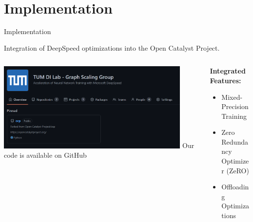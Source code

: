 \section{Implementation}

\begin{frame}{Implementation}
    \begin{center}
        \vspace{0.5cm}
        Integration of DeepSpeed optimizations into the Open Catalyst Project.
    \end{center}

    \begin{columns}
        \centering
        \begin{column}{0.5\textwidth}
            \centering
            \includegraphics[width=0.9\textwidth]{figures/ocp-branch.png}
            Our code is available on GitHub\footnotemark
        \end{column} 

        \begin{column}{0.5\textwidth}
            \textbf{Integrated Features:}

            \begin{itemize}
                \item \textcolor{tum-green}{} Mixed-Precision Training
                \item \textcolor{tum-green}{} Zero Redundancy Optimizer (ZeRO)
                \item \textcolor{tum-green}{} Offloading Optimizations
            \end{itemize}
        \end{column} 
    \end{columns}
\end{frame}

